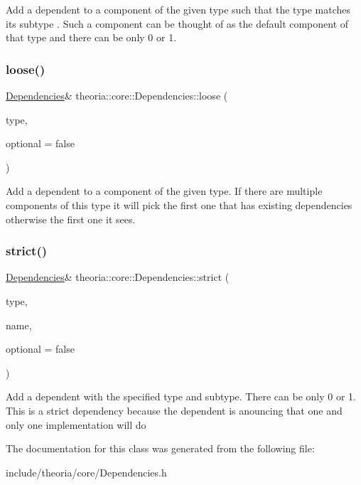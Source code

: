 Add a dependent to a component of the given type such that the type matches it\textquotesingle{}s subtype . Such a component can be thought of as the default component of that type and there can be only 0 or 1. \mbox{\label{classtheoria_1_1core_1_1Dependencies_afa22a8f9fc20d3ce417bac397ba22e7a}} 
\subsubsection{\texorpdfstring{loose()}{loose()}}
{\footnotesize\ttfamily \hyperlink{classtheoria_1_1core_1_1Dependencies}{Dependencies}\& theoria\+::core\+::\+Dependencies\+::loose (\begin{DoxyParamCaption}\item[{const Type\+Name \&}]{type,  }\item[{bool}]{optional = {\ttfamily false} }\end{DoxyParamCaption})\hspace{0.3cm}{\ttfamily [inline]}}

Add a dependent to a component of the given type. If there are multiple components of this type it will pick the first one that has existing dependencies otherwise the first one it sees. \mbox{\label{classtheoria_1_1core_1_1Dependencies_a7daeed943359e4290cbdcf6d0c3c57b5}} 
\subsubsection{\texorpdfstring{strict()}{strict()}}
{\footnotesize\ttfamily \hyperlink{classtheoria_1_1core_1_1Dependencies}{Dependencies}\& theoria\+::core\+::\+Dependencies\+::strict (\begin{DoxyParamCaption}\item[{const Type\+Name \&}]{type,  }\item[{const Sub\+Type\+Name \&}]{name,  }\item[{bool}]{optional = {\ttfamily false} }\end{DoxyParamCaption})\hspace{0.3cm}{\ttfamily [inline]}}

Add a dependent with the specified type and subtype. There can be only 0 or 1. This is a strict dependency because the dependent is anouncing that one and only one implementation will do 

The documentation for this class was generated from the following file\+:\begin{DoxyCompactItemize}
\item 
include/theoria/core/Dependencies.\+h\end{DoxyCompactItemize}
